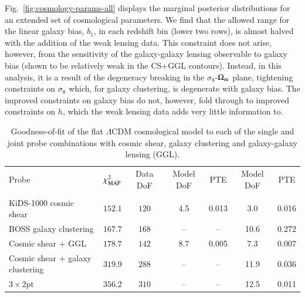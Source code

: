 Fig.~\ref{fig:cosmology-params-all} displays the marginal posterior distributions for an extended set of cosmological parameters.  
We find that the allowed range for the linear galaxy bias,  $b_1$, in each redshift bin (lower two rows), is almost halved with the addition of the weak lensing data. 
This constraint does not arise, however, from the sensitivity of the galaxy-galaxy lensing observable to galaxy bias (shown to be relatively weak in the CS+GGL contours). 
Instead, in this analysis, it is a result of the degeneracy breaking in the $\sigma_8$-$\Omega_{\rm m}$ plane, tightening constraints on $\sigma_8$ which, for galaxy clustering, is degenerate with galaxy bias. 
The improved constraints on galaxy bias do not, however, fold through to improved constraints on $h$, which the weak lensing data adds very little information to. 

\begin{table}
	\begin{center}
		\caption{Goodness-of-fit of the flat $\Lambda$CDM cosmological model to each of the single and joint probe combinations with cosmic shear, galaxy clustering and galaxy-galaxy lensing (GGL).}
		\label{tab:goodness-of-fit}
\begin{tabular}{lcccccc}
    \toprule
    Probe             & $\chi^2_{\rm MAP}$  & Data DoF  & Model DoF                   & PTE  & Model DoF          & PTE    \\
                      &                     &           &\citep{joachimi/etal:inprep} &      & \citep{Raveri2019} & \\
    \midrule
	KiDS-1000 cosmic shear     & $152.1$ & $120$  &4.5 & 0.013 &3.0 & 0.016 \\
	BOSS galaxy clustering & $167.7$ & $168$  &-- & -- &10.6 & 0.272 \\
	Cosmic shear + GGL & $178.7$ & $142$  &8.7 & 0.005 &7.3 & 0.007 \\
	Cosmic shear + galaxy clustering & $319.9$ & $288$  &-- & -- &11.9 & 0.036 \\
	$3\times2$pt & $356.2$ & $310$  &-- & -- &12.5 & 0.011 \\

    \bottomrule
\end{tabular}
	\end{center}
\end{table}



